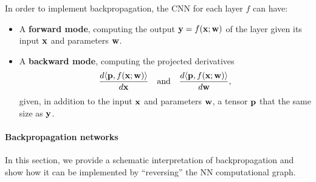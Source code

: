 In order to implement backpropagation, the CNN for each layer $f$ can have:
\begin{itemize}
	\item A \textbf{forward mode}, computing the output $\mathbf{y} = f(\mathbf{x};\mathbf{w})$ of the layer given its input $\mathbf{x}$ and parameters $\mathbf{w}$.
	\item A \textbf{backward mode}, computing the projected derivatives
	\[
	\frac{d \langle \mathbf{p}, f(\mathbf{x};\mathbf{w}) \rangle}
	{d \mathbf{x}}
	\quad\text{and}\quad
	\frac{d \langle \mathbf{p}, f(\mathbf{x};\mathbf{w}) \rangle}
	{d \mathbf{w}},
	\]
	given, in addition to the input $\mathbf{x}$ and parameters $\mathbf{w}$, a tensor $\mathbf{p}$ that the same size as $\mathbf{y}$.
\end{itemize}

\paragraph{Backpropagation networks}\label{s:bpnets}

In this section, we provide a schematic interpretation of backpropagation and show how it can be implemented by ``reversing'' the NN computational graph.

